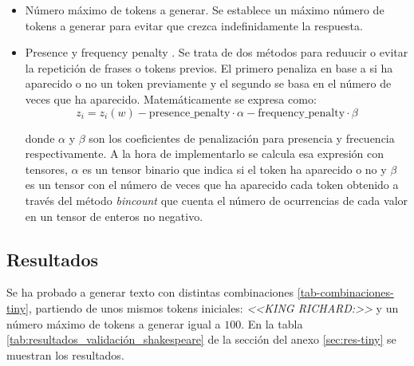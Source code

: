 \documentclass[11pt]{book}
\begin{document}
\begin{itemize}
    \item Número máximo de tokens a generar. Se establece un máximo número de tokens a generar para evitar que crezca indefinidamente la respuesta.
    
    \item Presence y frequency penalty \parencite{vyas2025transformer_decoder_part3}.
Se trata de dos métodos para reduucir o evitar la repetición de frases o tokens previos. El primero penaliza en base a si ha aparecido o no un token previamente y el segundo se basa en el número de veces que ha aparecido. Matemáticamente se expresa como: 
    \[
        z_i = z_i(w) - \text{presence\_penalty} \cdot \alpha - \text{frequency\_penalty} \cdot \beta
    \]

    donde $\alpha$ y $\beta$ son los coeficientes de penalización para presencia y frecuencia respectivamente.
A la hora de implementarlo se calcula esa expresión con tensores, $\alpha$ es un tensor binario que indica si el token ha aparecido o no y $\beta$ es un tensor con el número de veces que ha aparecido cada token obtenido a través del método \textit{bincount} que cuenta el número de ocurrencias de cada valor en un tensor de enteros no negativo.
\end{itemize}
\subsection{Resultados}

Se ha probado a generar texto con distintas combinaciones \ref{tab-combinaciones-tiny}, partiendo de unos mismos tokens iniciales: \textit{<<KING RICHARD:>>} y un número máximo de tokens a generar igual a $100$. En la tabla \ref{tab:resultados_validación_shakespeare} de la sección del anexo \ref{sec:res-tiny} se muestran los resultados.
\end{document}
